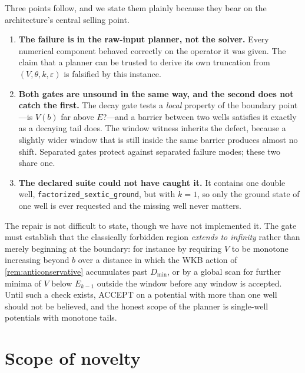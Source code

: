 \documentclass[twocolumn,10pt,a4paper]{article}
\theoremstyle{plain}
\theoremstyle{definition}
\newcommand{\eps}{\varepsilon}
\newcommand{\ACCEPT}{\textsf{ACCEPT}}
\begin{document}
Three points follow, and we state them plainly because they bear on the
architecture's central selling point.

\begin{enumerate}
\item \textbf{The failure is in the raw-input planner, not the solver.} Every
numerical component behaved correctly on the operator it was given. The claim
that a planner can be trusted to derive its own truncation from $(V,\theta,k,
\eps)$ is falsified by this instance.

\item \textbf{Both gates are unsound in the same way, and the second does not
catch the first.} The decay gate tests a \emph{local} property of the boundary
point---is $V(b)$ far above $E$?---and a barrier between two wells satisfies it
exactly as a decaying tail does. The window witness inherits the defect, because
a slightly wider window that is still inside the same barrier produces almost no
shift. Separated gates protect against separated failure modes; these two share
one.

\item \textbf{The declared suite could not have caught it.} It contains one
double well, \texttt{factorized\_sextic\_ground}, but with $k = 1$, so only the
ground state of one well is ever requested and the missing well never matters.

\end{enumerate}

The repair is not difficult to state, though we have not implemented it. The
gate must establish that the classically forbidden region \emph{extends to
infinity} rather than merely beginning at the boundary: for instance by
requiring $V$ to be monotone increasing beyond $b$ over a distance in which the
WKB action of \cref{rem:anticonservative} accumulates past $D_{\min}$, or by a
global scan for further minima of $V$ below $E_{k-1}$ outside the window before
any window is accepted. Until such a check exists, \ACCEPT{} on a potential with
more than one well should not be believed, and the honest scope of the planner
is single-well potentials with monotone tails.

\section{Scope of novelty}
\label{sec:novelty}
\end{document}
